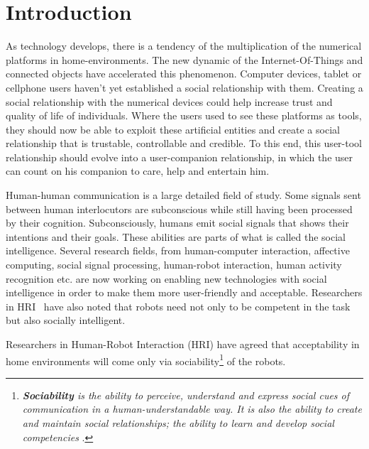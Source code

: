 \documentclass[smallextended]{svjour3}
\begin{document}
\section{Introduction}
\label{sec:introduction}
As technology develops, there is a tendency of the multiplication of the numerical platforms in home-environments. 
The new dynamic of the Internet-Of-Things and connected objects have accelerated this phenomenon. 
Computer devices, tablet or cellphone users haven't yet established a social relationship with them. 
Creating a social relationship with the numerical devices could help increase trust and quality of life of individuals.
Where the users used to see these platforms as tools, they should now be able to exploit these artificial entities and create a social relationship that is trustable, controllable and credible. 
To this end, this user-tool relationship should evolve into a user-companion relationship, in which the user can count on his companion to care, help and entertain him.

Human-human communication is a large detailed field of study. 
Some signals sent between human interlocutors are subconscious while still having been processed by their cognition.
Subconsciously, humans emit social signals that shows their intentions and their goals.
These abilities are parts of what is called the social intelligence.
Several research fields, from human-computer interaction, affective computing, social signal processing, human-robot interaction, human activity recognition etc. are now working on enabling new technologies with social intelligence in order to make them more user-friendly and acceptable.
Researchers in HRI~\cite{Tapus2007,Dautenhahn2007} have also noted that robots need not only to be competent in the task but also socially intelligent.

Researchers in Human-Robot Interaction (HRI) have agreed that acceptability in home environments will come only via sociability\footnote{\textit{\textbf{Sociability} is the ability to perceive, understand and express social cues of communication in a human-understandable way.
It is also the ability to create and maintain social relationships; the ability to learn and develop social competencies }\cite{Dautenhahn2007}.} of the robots.
\end{document}
